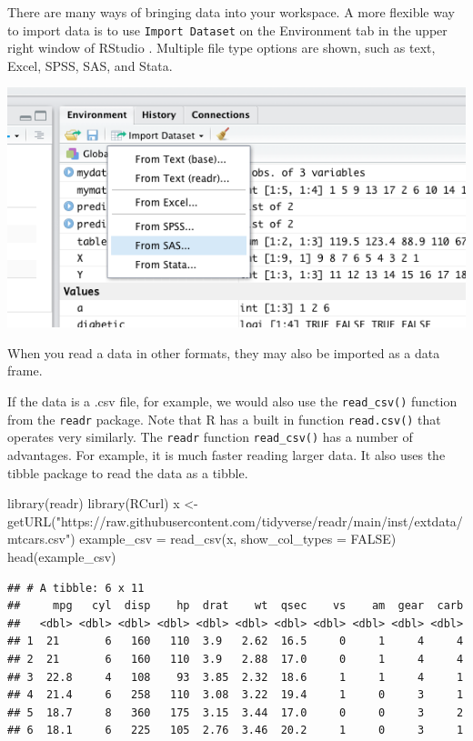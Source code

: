 \documentclass[
]{book}
\newenvironment{Shaded}{\begin{snugshade}}{\end{snugshade}}
\newcommand{\AttributeTok}[1]{\textcolor[rgb]{0.77,0.63,0.00}{#1}}
\newcommand{\ConstantTok}[1]{\textcolor[rgb]{0.00,0.00,0.00}{#1}}
\newcommand{\FunctionTok}[1]{\textcolor[rgb]{0.00,0.00,0.00}{#1}}
\newcommand{\NormalTok}[1]{#1}
\newcommand{\OtherTok}[1]{\textcolor[rgb]{0.56,0.35,0.01}{#1}}
\newcommand{\StringTok}[1]{\textcolor[rgb]{0.31,0.60,0.02}{#1}}
\begin{document}
There are many ways of bringing data into your workspace. A more flexible way to import data is to use \texttt{Import\ Dataset} on the Environment tab in the upper right window of RStudio . Multiple file type options are shown, such as text, Excel, SPSS, SAS, and Stata.

\includegraphics[width=7.67in]{png/Import}

When you read a data in other formats, they may also be imported as a data frame.

If the data is a .csv file, for example, we would also use the \texttt{read\_csv()} function from the \texttt{readr} package. Note that R has a built in function \texttt{read.csv()} that operates very similarly. The \texttt{readr} function \texttt{read\_csv()} has a number of advantages. For example, it is much faster reading larger data. It also uses the tibble package to read the data as a tibble.

\begin{Shaded}
\begin{Highlighting}[]
\FunctionTok{library}\NormalTok{(readr)}
\FunctionTok{library}\NormalTok{(RCurl)}
\NormalTok{x }\OtherTok{\textless{}{-}} \FunctionTok{getURL}\NormalTok{(}\StringTok{"https://raw.githubusercontent.com/tidyverse/readr/main/inst/extdata/mtcars.csv"}\NormalTok{)}
\NormalTok{example\_csv }\OtherTok{=} \FunctionTok{read\_csv}\NormalTok{(x, }\AttributeTok{show\_col\_types =} \ConstantTok{FALSE}\NormalTok{)}
\FunctionTok{head}\NormalTok{(example\_csv)}
\end{Highlighting}
\end{Shaded}

\begin{verbatim}
## # A tibble: 6 x 11
##     mpg   cyl  disp    hp  drat    wt  qsec    vs    am  gear  carb
##   <dbl> <dbl> <dbl> <dbl> <dbl> <dbl> <dbl> <dbl> <dbl> <dbl> <dbl>
## 1  21       6   160   110  3.9   2.62  16.5     0     1     4     4
## 2  21       6   160   110  3.9   2.88  17.0     0     1     4     4
## 3  22.8     4   108    93  3.85  2.32  18.6     1     1     4     1
## 4  21.4     6   258   110  3.08  3.22  19.4     1     0     3     1
## 5  18.7     8   360   175  3.15  3.44  17.0     0     0     3     2
## 6  18.1     6   225   105  2.76  3.46  20.2     1     0     3     1
\end{verbatim}
\end{document}
